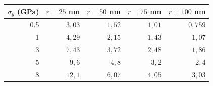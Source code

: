 \begin{tabular}{rrrrr}
\hline
$\sigma_y$ (GPa) & $r=25$ nm & $r=50$ nm & $r=75$ nm & $r=100$ nm \\
\hline
0.5 & $3{,}03$ & $1{,}52$ & $1{,}01$ & $0{,}759$ \\
1 & $4{,}29$ & $2{,}15$ & $1{,}43$ & $1{,}07$ \\
3 & $7{,}43$ & $3{,}72$ & $2{,}48$ & $1{,}86$ \\
5 & $9{,}6$ & $4{,}8$ & $3{,}2$ & $2{,}4$ \\
8 & $12{,}1$ & $6{,}07$ & $4{,}05$ & $3{,}03$ \\
\hline
\end{tabular}
